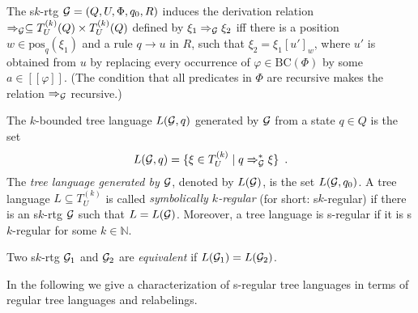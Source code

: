 \documentclass[10pt]{scrartcl}
\newcommand{\nat}{\mathbb{N}}
\newcommand{\seml}{[\![}
\newcommand{\semr}{]\!]}
\newcommand{\pos}{\mathrm{pos}}
\newcommand{\BC}{\mathrm{BC}}
\newcommand{\G}{{\cal G}}
\def\ui#1{^{(#1)}}
\begin{document}
The s$k$-rtg $\G = (Q,U,\Phi,q_0,R)$ induces the derivation
relation $\Rightarrow_\G \subseteq T_U\ui k(Q) \times T_U\ui k(Q)$ defined by
$\xi_1 \Rightarrow_\G \xi_2$ iff there is a position $w \in \pos_q(\xi_1)$ and a rule $q \rightarrow u$ in $R$,  such that $\xi_2 = \xi_1[u']_w$, where $u'$ is
obtained from $u$ by replacing every occurrence of $\varphi\in \BC(\Phi)$ by some $a \in \seml \varphi\semr$. (The condition that all predicates in $\Phi$ are recursive makes the relation $\Rightarrow_\G$ recursive.)

The $k$-bounded tree language $L(\G,q)$ generated by $\G$ from a state $q\in Q$ is the set 
\[
L(\G,q) = \{\xi \in T_U\ui k \mid q \Rightarrow_\G^* \xi\}\enspace.
\] 
The \emph{tree language generated by $\G$},
denoted by $L(\G)$, is the set $L(\G,q_0)$. A tree language $L \subseteq
T_U\ui k$ is called \emph{symbolically $k$-regular} (for short: s$k$-regular) if there is an s$k$-rtg $\G$ such that $L = L(\G)$. Moreover, a tree language is s-regular if it is s$k$-regular for some $k\in \nat$.

Two s$k$-rtg $\G_1$ and $\G_2$ are \emph{equivalent} if $L(\G_1)= L(\G_2)$.  



In the following we give a characterization of s-regular tree
languages in terms of regular tree languages and relabelings.

\
\end{document}
